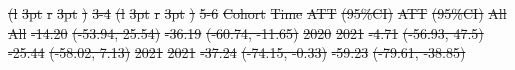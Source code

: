 \documentclass[
  letterpaper,
  DIV=11,
  numbers=noendperiod]{scrartcl}
\providecommand{\DIFdeltex}[1]{{\protect\color{red}\sout{#1}}}                      %
\providecommand{\DIFdelFL}[1]{\DIFdel{#1}} %
\providecommand{\DIFdel}[1]{\texorpdfstring{\DIFdeltex{#1}}{}} %
\begin{document}
\DIFdelFL{(l}%
\DIFdelFL{3pt}%
\DIFdelFL{r}%
\DIFdelFL{3pt}%
\DIFdelFL{)}%
\DIFdelFL{3-4}%
\DIFdelFL{(l}%
\DIFdelFL{3pt}%
\DIFdelFL{r}%
\DIFdelFL{3pt}%
\DIFdelFL{)}%
\DIFdelFL{5-6}%
\DIFdelFL{Cohort }%
\DIFdelFL{Time }%
\DIFdelFL{ATT }%
\DIFdelFL{(95\%CI) }%
\DIFdelFL{ATT }%
\DIFdelFL{(95\%CI)}%
\DIFdelFL{All }%
\DIFdelFL{All }%
\DIFdelFL{-14.20 }%
\DIFdelFL{(-53.94, 25.54) }%
\DIFdelFL{-36.19 }%
\DIFdelFL{(-60.74, -11.65)}%
\DIFdelFL{2020 }%
\DIFdelFL{2021 }%
\DIFdelFL{-4.71 }%
\DIFdelFL{(-56.93, 47.5) }%
\DIFdelFL{-25.44 }%
\DIFdelFL{(-58.02, 7.13)}%
\DIFdelFL{2021 }%
\DIFdelFL{2021 }%
\DIFdelFL{-37.24 }%
\DIFdelFL{(-74.15, -0.33) }%
\DIFdelFL{-59.23 }%
\DIFdelFL{(-79.61, -38.85)}%
\end{document}
